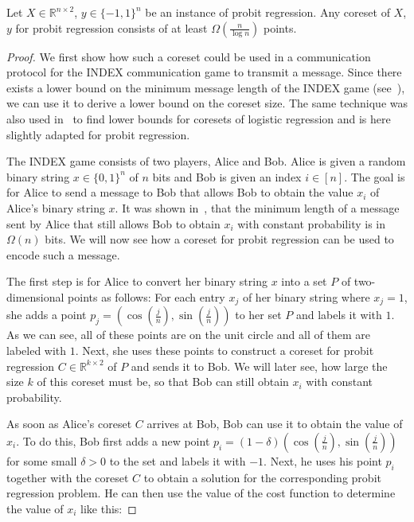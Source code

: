 \begin{theorem}
    Let $X \in \mathbb{R}^{n \times 2}$, $y \in \{-1, 1\}^n$ be an
    instance of probit regression.
    Any coreset of $X$, $y$ for probit regression consists of
    at least $\Omega\left(\frac{n}{\log{n}}\right)$ points.
\end{theorem}
\begin{proof}
    We first show how such a coreset could be used in a
    communication protocol for the INDEX communication game
    to transmit a message.
    Since there exists a lower bound on the minimum
    message length of the INDEX game (see~\cite{index}),
    we can use it to derive a lower bound on the
    coreset size.
    The same technique was also used in~\cite{on-coresets} to find
    lower bounds for coresets of logistic regression and is here slightly
    adapted for probit regression.

    The INDEX game consists of two players, Alice and Bob.
    Alice is given a random binary string $x \in \{0, 1\}^n$ of $n$ bits
    and Bob is given an index $i \in [n]$.
    The goal is for Alice to send a message to Bob that allows
    Bob to obtain the value $x_i$ of Alice's binary string $x$.
    It was shown in~\cite{index}, that the minimum length of a message
    sent by Alice that still allows Bob to obtain $x_i$ with
    constant probability is in $\Omega(n)$ bits.
    We will now see how a coreset for probit regression can be used
    to encode such a message.

    The first step is for Alice to convert her binary string $x$ into
    a set $P$ of two-dimensional points as follows:
    For each entry $x_j$ of her binary string where $x_j = 1$, she adds
    a point $p_j = \left( \cos{\left(\frac{j}{n}\right)},
        \sin{\left(\frac{j}{n}\right)} \right)$
    to her set $P$ and labels it with $1$.
    As we can see, all of these points are on the unit circle and all
    of them are labeled with $1$.
    Next, she uses these points to construct a coreset for probit regression
    $C \in \mathbb{R}^{k \times 2}$ of $P$
    and sends it to Bob. We will later see, how
    large the size $k$ of this coreset must be, so that Bob can still
    obtain $x_i$ with constant probability.

    As soon as Alice's coreset $C$ arrives at Bob, Bob can use it to
    obtain the value of $x_i$.
    To do this, Bob first adds a new point $p_i = (1 - \delta)
        \left( \cos{\left(\frac{j}{n}\right)},
        \sin{\left(\frac{j}{n}\right)} \right)$
    for some small $\delta > 0$
    to the set and labels it with $-1$.
    Next, he uses his point $p_i$ together with the coreset $C$ to
    obtain a solution for the corresponding probit regression problem.
    He can then use the value of the cost function to determine the value
    of $x_i$ like this:


\end{proof}
